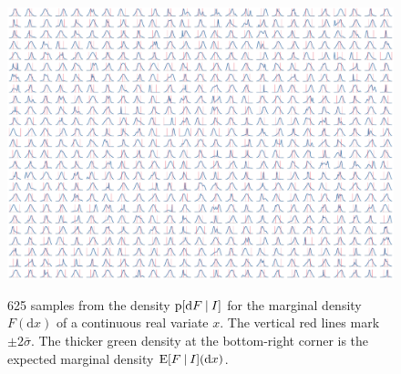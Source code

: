 \documentclass[\ifafour a4paper,12pt,\else a5paper,10pt,\fi%
onecolumn,oneside,article,%
british%
]{memoir}
\theoremstyle{remark}
\theoremstyle{innote}
\newcommand*{\di}{\mathrm{d}}%
\newcommand*{\p}{\mathrm{p}}%
\newcommand*{\E}{\mathrm{E}}
\renewcommand*{\|}[1][]{\nonscript\:#1\vert\nonscript\:\mathopen{}}
\newcommand*{\sigmao}{\bar{\sigma}}
\begin{document}
\begin{figure}
\centering\includegraphics[width=\linewidth]{prior1D_real.pdf}\\
\caption{625 samples from the density $\p[\di F \| I]$ for the marginal density $F(\di x)$ of a continuous real variate $x$. The vertical red lines mark $\pm2\sigmao$. The thicker green density at the bottom-right corner is the expected marginal density $\E[F\| I](\di x)$.}\label{fig:marginal_censored}
\end{figure}
\end{document}
